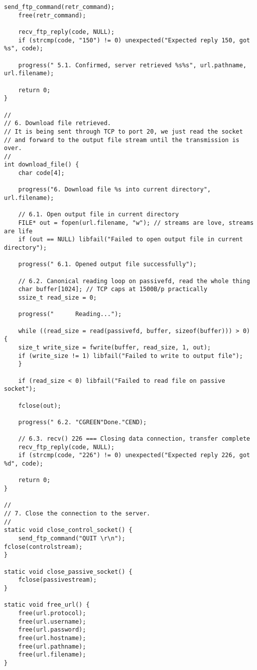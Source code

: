 \documentclass[subfiles]{main.tex}
\begin{document}
\begin{lstlisting}[style=C-sublime]
	send_ftp_command(retr_command);
	free(retr_command);
	
	recv_ftp_reply(code, NULL);
	if (strcmp(code, "150") != 0) unexpected("Expected reply 150, got %s", code);
	
	progress(" 5.1. Confirmed, server retrieved %s%s", url.pathname, url.filename);
	
	return 0;
}

//
// 6. Download file retrieved.
// It is being sent through TCP to port 20, we just read the socket
// and forward to the output file stream until the transmission is over.
//
int download_file() {
	char code[4];
	
	progress("6. Download file %s into current directory", url.filename);
	
	// 6.1. Open output file in current directory
	FILE* out = fopen(url.filename, "w"); // streams are love, streams are life
	if (out == NULL) libfail("Failed to open output file in current directory");
	
	progress(" 6.1. Opened output file successfully");
	
	// 6.2. Canonical reading loop on passivefd, read the whole thing
	char buffer[1024]; // TCP caps at 1500B/p practically
	ssize_t read_size = 0;
	
	progress("      Reading...");
	
	while ((read_size = read(passivefd, buffer, sizeof(buffer))) > 0) {
	size_t write_size = fwrite(buffer, read_size, 1, out);
	if (write_size != 1) libfail("Failed to write to output file");
	}
	
	if (read_size < 0) libfail("Failed to read file on passive socket");
	
	fclose(out);
	
	progress(" 6.2. "CGREEN"Done."CEND);
	
	// 6.3. recv() 226 === Closing data connection, transfer complete
	recv_ftp_reply(code, NULL);
	if (strcmp(code, "226") != 0) unexpected("Expected reply 226, got %d", code);
	
	return 0;
}

//
// 7. Close the connection to the server.
//
static void close_control_socket() {
	send_ftp_command("QUIT \r\n");
fclose(controlstream);
}

static void close_passive_socket() {
	fclose(passivestream);
}

static void free_url() {
	free(url.protocol);
	free(url.username);
	free(url.password);
	free(url.hostname);
	free(url.pathname);
	free(url.filename);
}
\end{lstlisting}
\end{document}
